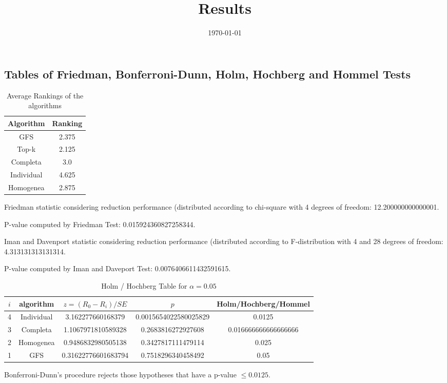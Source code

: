 \documentclass[a4paper,10pt]{article}
\title{Results}
\author{}
\date{\today}
\begin{document}
\begin{landscape}
\oddsidemargin 0in \topmargin 0in\maketitle
\section{Tables of Friedman, Bonferroni-Dunn, Holm, Hochberg and Hommel Tests}
\begin{table}[!htp]
\centering
\caption{Average Rankings of the algorithms
}\begin{tabular}{c|c}
Algorithm&Ranking\\
\hline
GFS&2.375\\
Top-k&2.125\\
Completa&3.0\\
Individual&4.625\\
Homogenea&2.875\\
\end{tabular}
\end{table}


Friedman statistic considering reduction performance (distributed according to chi-square with 4 degrees of freedom: 12.200000000000001.


P-value computed by Friedman Test: 0.015924360827258344.\newline

Iman and Davenport statistic considering reduction performance (distributed according to F-distribution with 4 and 28 degrees of freedom: 4.313131313131314.


P-value computed by Iman and Daveport Test: 0.0076406611432591615.\newline

\begin{table}[!htp]
\centering\tiny
\caption{Holm / Hochberg Table for $\alpha=0.05$}
\begin{tabular}{ccccc}
$i$&algorithm&$z=(R_0 - R_i)/SE$&$p$&Holm/Hochberg/Hommel\\
\hline
4&Individual&3.162277660168379&0.0015654022580025829&0.0125\\
3&Completa&1.1067971810589328&0.2683816272927608&0.016666666666666666\\
2&Homogenea&0.9486832980505138&0.3427817111479114&0.025\\
1&GFS&0.31622776601683794&0.7518296340458492&0.05\\
\hline
\end{tabular}
\end{table}
Bonferroni-Dunn's procedure rejects those hypotheses that have a p-value $\le0.0125$.



\end{landscape}
\end{document}
